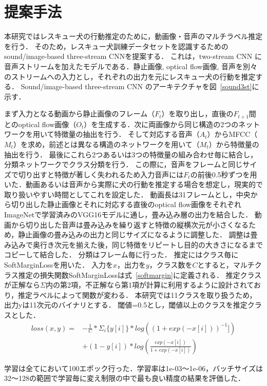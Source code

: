 \documentclass[MIRU,submit]{miru2019j}
\begin{document}
\section{提案手法}
本研究ではレスキュー犬の行動推定のために，動画像・音声のマルチラベル推定を行う．
そのため，レスキュー犬訓練データセットを認識するためのsound/image-based three-stream CNNを提案する．
これは，two-stream CNN に音声ストリームを加えたモデルである．静止画像, optical flow画像, 音声を別々のストリームへの入力とし，それぞれの出力を元にレスキュー犬の行動を推定する．
Sound/image-based three-stream CNN のアーキテクチャを図~\ref{sound3st}に示す．

まず入力となる動画から静止画像のフレーム（$F_t$）を取り出し，直後の$F_{t+1}$間とのoptical flow画像（$O_t$）を生成する．次に両画像から同じ構造の2つのネットワークを用いて特徴量の抽出を行う．
そして対応する音声（$A_t$）からMFCC（$M_t$）を求め，前述とは異なる構造のネットワークを用いて（$M_t$）から特徴量の抽出を行う．
最後にこれら2つあるいは3つの特徴量の組み合わせ毎に結合し，分類ネットワークでクラス分類を行う．
この際に，音声をフレームと同じサイズで切り出すと特徴が著しく失われるため入力音声には$F_t$の前後0.5秒ずつを用いた．動画あるいは音声から実際に犬の行動を推定する場合を想定し，現実的で取り扱いやすい時間としてこれを設定した．
動画長は31フレームとし，中央から切り出した静止画像とそれに対応する直後のoptical flow画像をそれぞれImageNetで学習済みのVGG16モデルに通し，畳み込み層の出力を結合した．
動画から切り出した音声は畳み込みを繰り返すと特徴の縦横次元が小さくなるため，静止画像の畳み込みの出力と同じサイズになるように調整した．
調整は畳み込みで奥行き次元を揃えた後，同じ特徴をリピートし目的の大きさになるまでコピーして結合した．
分類はフレーム毎に行った．
推定にはクラス毎にSoftMarginLossを用いた．
入力を$x$，出力を$y$，クラス数を$C$とすると，マルチクラス推定の損失関数SoftMarginLossは式~\ref{softmargin}に定義される．
推定クラスが正解なら$\Sigma$内の第2項，不正解なら第1項が計算に利用するように設計されており，推定ラベルによって関数が変わる．
本研究では11クラスを取り扱うため，出力yは11次元のバイナリとする．
閾値=0.5とし，閾値以上のクラスを推定クラスとした．
\begin{equation}
    \label{softmargin}
    \begin{split}
    loss(x, y) = &-\frac{1}{C} * \Sigma_{i} \{y[i]\} * log((1+exp(-x[i]))^{-1}])\\
    &+ (1 - y[i]) * log(\frac{exp(-x[i])}{1+exp(-x[i])})
    \end{split}
\end{equation}

学習は全てにおいて100エポック行った．学習率は1e-03〜1e-06，バッチサイズは32〜128の範囲で学習毎に変え制限の中で最も良い精度の結果を評価した．
\end{document}

